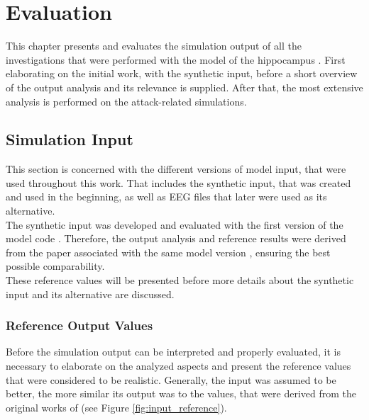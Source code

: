 \chapter{Evaluation} %
\label{chap:evaluation}
This chapter presents and evaluates the simulation output of all the investigations that were performed with the model of the hippocampus \cite{HippSimModel.1} \cite{HippSimModel.2}. First elaborating on the initial work, with the synthetic input, before a short overview of the output analysis and its relevance is supplied. After that, the most extensive analysis is performed on the attack-related simulations. 


\section{Simulation Input}
    This section is concerned with the different versions of model input, that were used throughout this work. That includes the synthetic input, that was created and used in the beginning, as well as EEG files that later were used as its alternative.\\
    The synthetic input was developed and evaluated with the first version of the model code \cite{HippSimModel.1}. Therefore, the output analysis and reference results were derived from the paper associated with the same model version \cite{Aussel.2018}, ensuring the best possible comparability.\\
    These reference values will be presented before more details about the synthetic input and its alternative are discussed. 


    \subsection{Reference Output Values}
    Before the simulation output can be interpreted and properly evaluated, it is necessary to elaborate on the analyzed aspects and present the reference values that were considered to be realistic. Generally, the input was assumed to be better, the more similar its output was to the values, that were derived from the original works of \textcite{Aussel.2018} (see Figure \ref{fig:input_reference}).
    
